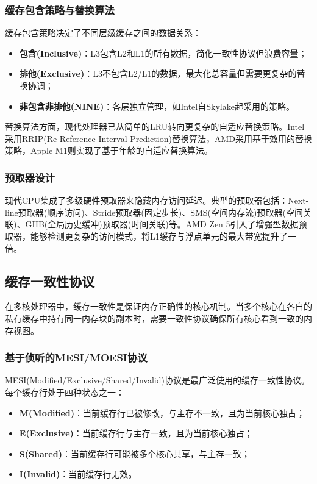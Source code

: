 \documentclass[12pt,a4paper]{IEEEtran}
\begin{document}
\subsubsection{缓存包含策略与替换算法}

缓存包含策略决定了不同层级缓存之间的数据关系：
\begin{itemize}
\item \textbf{包含(Inclusive)}：L3包含L2和L1的所有数据，简化一致性协议但浪费容量；
\item \textbf{排他(Exclusive)}：L3不包含L2/L1的数据，最大化总容量但需要更复杂的替换协调；
\item \textbf{非包含非排他(NINE)}：各层独立管理，如Intel自Skylake起采用的策略\cite{intel2015skylake}。
\end{itemize}

替换算法方面，现代处理器已从简单的LRU转向更复杂的自适应替换策略。Intel采用RRIP(Re-Reference Interval Prediction)替换算法，AMD采用基于效用的替换策略，Apple M1则实现了基于年龄的自适应替换算法\cite{jaleel2010rrip}。

\subsubsection{预取器设计}

现代CPU集成了多级硬件预取器来隐藏内存访问延迟。典型的预取器包括：Next-line预取器(顺序访问)、Stride预取器(固定步长)、SMS(空间内存流)预取器(空间关联)、GHB(全局历史缓冲)预取器(时间关联)等\cite{falsafi2014prefetching}。AMD Zen 5引入了增强型数据预取器，能够检测更复杂的访问模式，将L1缓存与浮点单元的最大带宽提升了一倍。

\subsection{缓存一致性协议}

在多核处理器中，缓存一致性是保证内存正确性的核心机制。当多个核心在各自的私有缓存中持有同一内存块的副本时，需要一致性协议确保所有核心看到一致的内存视图\cite{sorin2011primer}。

\subsubsection{基于侦听的MESI/MOESI协议}

MESI(Modified/Exclusive/Shared/Invalid)协议是最广泛使用的缓存一致性协议。每个缓存行处于四种状态之一：
\begin{itemize}
\item \textbf{M(Modified)}：当前缓存行已被修改，与主存不一致，且为当前核心独占；
\item \textbf{E(Exclusive)}：当前缓存行与主存一致，且为当前核心独占；
\item \textbf{S(Shared)}：当前缓存行可能被多个核心共享，与主存一致；
\item \textbf{I(Invalid)}：当前缓存行无效。
\end{itemize}
\end{document}
